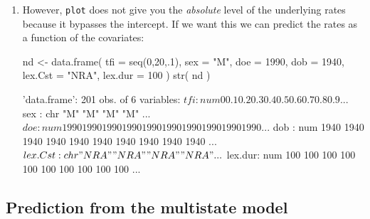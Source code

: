 \begin{enumerate}[resume]
\item However, \texttt{plot} does not give you the \emph{absolute}
  level of the underlying rates because it bypasses the intercept. If
  we want this we can predict the rates as a function of the covariates:
\begin{Schunk}
\begin{Sinput}
 nd <- data.frame( tfi = seq(0,20,.1),
                   sex = "M",
                   doe = 1990,
                   dob = 1940,
               lex.Cst = "NRA",
               lex.dur = 100 )
 str( nd )
\end{Sinput}
\begin{Soutput}
'data.frame':	201 obs. of  6 variables:
 $ tfi    : num  0 0.1 0.2 0.3 0.4 0.5 0.6 0.7 0.8 0.9 ...
 $ sex    : chr  "M" "M" "M" "M" ...
 $ doe    : num  1990 1990 1990 1990 1990 1990 1990 1990 1990 1990 ...
 $ dob    : num  1940 1940 1940 1940 1940 1940 1940 1940 1940 1940 ...
 $ lex.Cst: chr  "NRA" "NRA" "NRA" "NRA" ...
 $ lex.dur: num  100 100 100 100 100 100 100 100 100 100 ...
\end{Soutput}
\end{Schunk}

\end{enumerate}

\subsection{Prediction from the multistate model}


